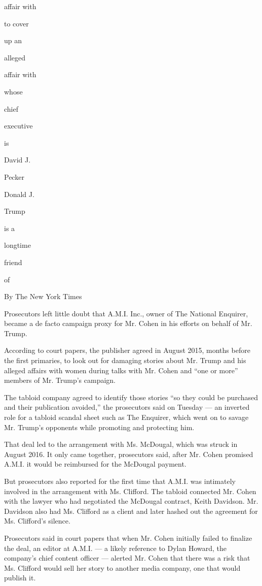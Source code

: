 affair with

to cover

up an

alleged

affair with

whose

chief

executive

is

David J.

Pecker

Donald J.

Trump

is a

longtime

friend

of

By The New York Times

Prosecutors left little doubt that A.M.I. Inc., owner of The National
Enquirer, became a de facto campaign proxy for Mr. Cohen in his efforts
on behalf of Mr. Trump.

According to court papers, the publisher agreed in August 2015, months
before the first primaries, to look out for damaging stories about Mr.
Trump and his alleged affairs with women during talks with Mr. Cohen and
``one or more'' members of Mr. Trump's campaign.

The tabloid company agreed to identify those stories ``so they could be
purchased and their publication avoided,'' the prosecutors said on
Tuesday --- an inverted role for a tabloid scandal sheet such as The
Enquirer, which went on to savage Mr. Trump's opponents while promoting
and protecting him.

That deal led to the arrangement with Ms. McDougal, which was struck in
August 2016. It only came together, prosecutors said, after Mr. Cohen
promised A.M.I. it would be reimbursed for the McDougal payment.

But prosecutors also reported for the first time that A.M.I. was
intimately involved in the arrangement with Ms. Clifford. The tabloid
connected Mr. Cohen with the lawyer who had negotiated the McDougal
contract, Keith Davidson. Mr. Davidson also had Ms. Clifford as a client
and later hashed out the agreement for Ms. Clifford's silence.

Prosecutors said in court papers that when Mr. Cohen initially failed to
finalize the deal, an editor at A.M.I. --- a likely reference to Dylan
Howard, the company's chief content officer --- alerted Mr. Cohen that
there was a risk that Ms. Clifford would sell her story to another media
company, one that would publish it.

